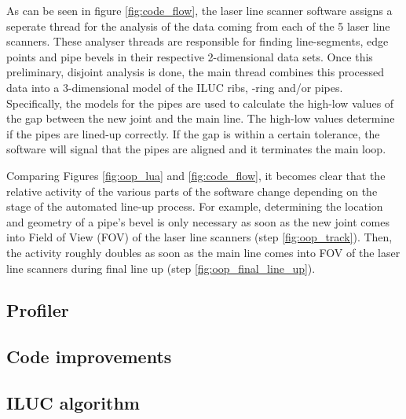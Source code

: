 As can be seen in figure \ref{fig:code_flow}, the laser line scanner software assigns a seperate thread for the analysis of the data coming from
each of the 5 laser line scanners. These analyser threads are responsible for finding line-segments, edge points and pipe bevels in their respective 2-dimensional
data sets. Once this preliminary, disjoint analysis is done, the main thread combines this processed data into a 3-dimensional model of the ILUC ribs, -ring and/or pipes.
Specifically, the models for the pipes are used to calculate the high-low values of the gap between the new joint and the main line.
The high-low values determine if the pipes are lined-up correctly. If the gap is within a certain tolerance, the software will signal that
the pipes are aligned and it terminates the main loop.

Comparing Figures \ref{fig:oop_lua} and \ref{fig:code_flow}, it becomes clear that the relative activity of the various parts of the software change
depending on the stage of the automated line-up process. For example, determining the location and geometry of a pipe's bevel is only necessary as soon as
the new joint comes into Field of View (FOV) of the laser line scanners (step \ref{fig:oop_track}). Then, the activity roughly doubles as soon as the main line
comes into FOV of the laser line scanners during final line up (step \ref{fig:oop_final_line_up}).

\subsection{Profiler} \label{ssec:code_refactoring}

\subsection{Code improvements} \label{ssec:code_improvements}

\subsection{ILUC algorithm} \label{ssec:ILUC_algorithm}